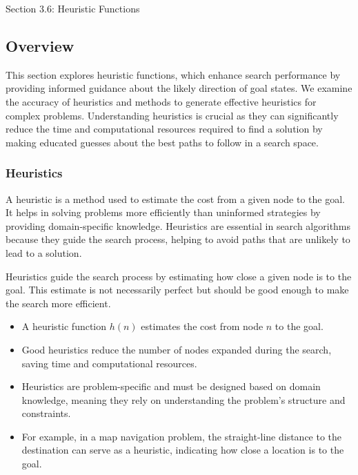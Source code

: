 \begin{notes}{Section 3.6: Heuristic Functions}
    \subsection*{Overview}

    This section explores heuristic functions, which enhance search performance by providing informed guidance about the likely direction of goal states. We examine the accuracy of heuristics and 
    methods to generate effective heuristics for complex problems. Understanding heuristics is crucial as they can significantly reduce the time and computational resources required to find a 
    solution by making educated guesses about the best paths to follow in a search space.
    
    \subsubsection*{Heuristics}
    
    A heuristic is a method used to estimate the cost from a given node to the goal. It helps in solving problems more efficiently than uninformed strategies by providing domain-specific knowledge. 
    Heuristics are essential in search algorithms because they guide the search process, helping to avoid paths that are unlikely to lead to a solution.
    
    \begin{highlight}
    
    Heuristics guide the search process by estimating how close a given node is to the goal. This estimate is not necessarily perfect but should be good enough to make the search more efficient.
    
    \begin{itemize}
        \item A heuristic function \(h(n)\) estimates the cost from node \(n\) to the goal.
        \item Good heuristics reduce the number of nodes expanded during the search, saving time and computational resources.
        \item Heuristics are problem-specific and must be designed based on domain knowledge, meaning they rely on understanding the problem's structure and constraints.
        \item For example, in a map navigation problem, the straight-line distance to the destination can serve as a heuristic, indicating how close a location is to the goal.
    \end{itemize}
    

\end{highlight}
\end{notes}
